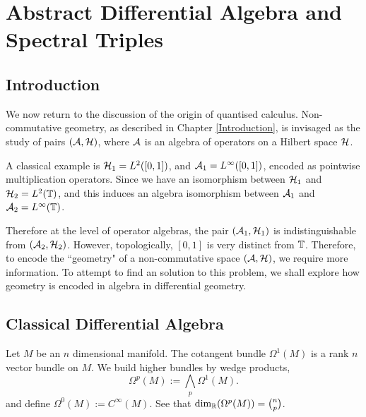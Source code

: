 
\chapter{Abstract Differential Algebra and Spectral Triples} %

\label{AbstractDifferentialAlgebra} %




\section{Introduction}
We now return to the discussion of the origin of quantised calculus. Non-commutative
geometry, as described in Chapter \ref{Introduction}, is invisaged
as the study of pairs $(\mathcal{A},\mathcal{H})$, where $\mathcal{A}$ is an algebra
of operators on a Hilbert space $\mathcal{H}$.

A classical example is $\mathcal{H}_1 = L^2([0,1])$, and $\mathcal{A}_1 = L^\infty([0,1])$,
encoded as pointwise multiplication operators. 
Since we have an isomorphism between $\mathcal{H}_1$ and $\mathcal{H}_2 = L^2(\mathbb{T})$, and
this induces an algebra isomorphism between $\mathcal{A}_1$ and $\mathcal{A}_2 = L^\infty(\mathbb{T})$.

Therefore at the level of operator algebras, the pair $(\mathcal{A}_1,\mathcal{H}_1)$ is indistinguishable
from $(\mathcal{A}_2,\mathcal{H}_2)$. However, topologically, $[0,1]$ is very distinct
from $\mathbb{T}$. Therefore, to encode the ``geometry" of a non-commutative
space $(\mathcal{A},\mathcal{H})$, we require more information. To attempt to find
an solution to this problem, we shall explore how geometry is encoded
in algebra in differential geometry.

\section{Classical Differential Algebra}
Let $M$ be an $n$ dimensional manifold. The cotangent bundle $\Omega^1(M)$
is a rank $n$ vector bundle on $M$. We build higher bundles by wedge products,
\begin{equation*}
    \Omega^p(M) := \bigwedge_p \Omega^1(M).
\end{equation*}
and define $\Omega^0(M) := C^\infty(M)$. See that $\dim_{\mathbb{R}}(\Omega^p(M)) = \binom{n}{p}$.


